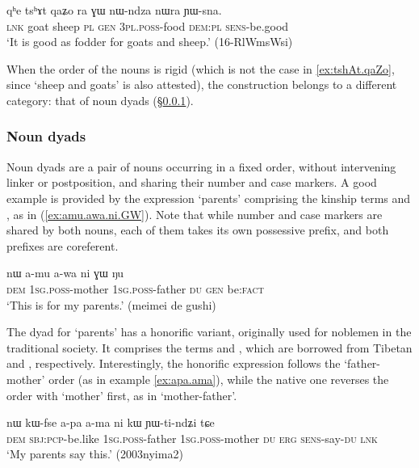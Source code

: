 \begin{exe}
\ex \label{ex:tshAt.qaZo}
 \gll  qʰe tsʰɤt qaʑo ra ɣɯ nɯ-ndza nɯra ɲɯ-sna.  \\
 \textsc{lnk} goat sheep \textsc{pl} \textsc{gen} \textsc{3pl}.\textsc{poss}-food \textsc{dem}:\textsc{pl} \textsc{sens}-be.good \\
\glt `It is good as fodder for goats and sheep.' (16-RlWmsWsi)
\end{exe}

When the order of the nouns is rigid (which is not the case in \ref{ex:tshAt.qaZo}, since  `sheep and goats' is also attested), the construction belongs to a different category: that of noun dyads (§\ref{sec:dyads}).

\subsubsection{Noun dyads} \label{sec:dyads}
Noun dyads are a pair of nouns occurring in a fixed order, without intervening linker or postposition, and sharing their number and case markers. A good example is provided by the expression `parents' comprising the kinship terms  and , as in (\ref{ex:amu.awa.ni.GW}). Note that while number and case markers are shared by both nouns, each of them takes its own possessive prefix, and both prefixes are coreferent. 

\begin{exe}
\ex \label{ex:amu.awa.ni.GW}
 \gll nɯ a-mu a-wa ni ɣɯ ŋu \\
 \textsc{dem}  \textsc{1sg}.\textsc{poss}-mother \textsc{1sg}.\textsc{poss}-father \textsc{du} \textsc{gen} be:\textsc{fact} \\
 \glt `This is for my parents.' (meimei de gushi)
\end{exe}

The dyad for `parents' has a honorific variant, originally used for noblemen in the traditional society. It comprises the terms  and , which are borrowed from Tibetan   and , respectively. Interestingly, the honorific expression follows the `father-mother' order (as in example \ref{ex:apa.ama}), while the native one reverses the order with `mother' first, as in `mother-father'. 

\begin{exe}
\ex \label{ex:apa.ama}
 \gll nɯ kɯ-fse a-pa a-ma ni kɯ ɲɯ-ti-ndʑi tɕe \\
 \textsc{dem} \textsc{sbj}:\textsc{pcp}-be.like \textsc{1sg}.\textsc{poss}-father  \textsc{1sg}.\textsc{poss}-mother \textsc{du} \textsc{erg} \textsc{sens}-say-\textsc{du} \textsc{lnk} \\
 \glt `My parents say this.' (2003nyima2)
\end{exe}

